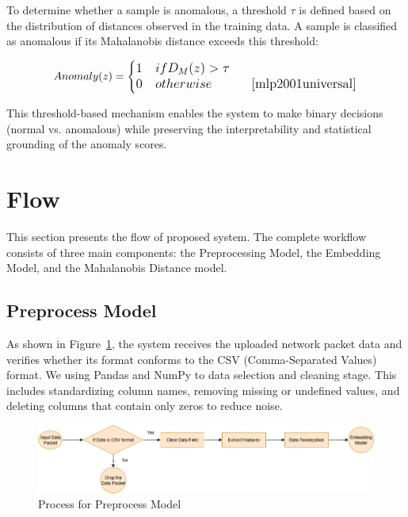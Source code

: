 \begin{ZhChapter}
    To determine whether a sample is anomalous, a threshold \(\tau\) is defined based on the distribution of distances observed in the training data. A sample is classified as anomalous if its Mahalanobis distance exceeds this threshold:

    \begin{equation}
        \text{Anomaly}(z) =
        \begin{cases}
            1 & \text{if } D_M(z) > \tau                                            \\
            0 & \text{otherwise} \tag*{\makebox[3.8cm][r]{\cite{mlp2001universal}}}
        \end{cases}
    \end{equation}

    This threshold-based mechanism enables the system to make binary decisions (normal vs. anomalous) while preserving the interpretability and statistical grounding of the anomaly scores.





    \section{Flow} %
    This section presents the flow of proposed system. The complete workflow consists of three main components: the Preprocessing Model, the Embedding Model, and the Mahalanobis Distance model.

    \subsection{Preprocess Model}
    As shown in Figure~\ref{fig:FlowChart}, the system receives the uploaded network packet data and verifies whether its format conforms to the CSV (Comma-Separated Values) format. We using Pandas and NumPy to data selection and cleaning stage. This includes standardizing column names, removing missing or undefined values, and deleting columns that contain only zeros to reduce noise.




    \begin{figure}[htbp]
        \centering
        \includegraphics[width = 1\textwidth]{image/FlowChart.jpg}
        \caption{Process for Preprocess Model}
        \label{fig:FlowChart}
    \end{figure}


\end{ZhChapter}
